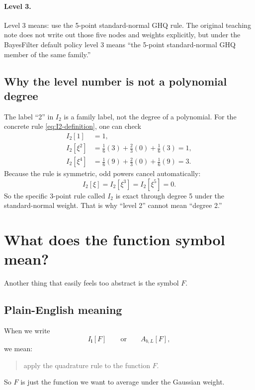 \documentclass[11pt]{article}
\begin{document}
\paragraph{Level 3.}
Level 3 means: use the 5-point standard-normal GHQ rule.  The original teaching
note does not write out those five nodes and weights explicitly, but under the
BayesFilter default policy level 3 means ``the 5-point standard-normal GHQ
member of the same family.''

\subsection{Why the level number is not a polynomial degree}

The label ``2'' in \(I_2\) is a family label, not the degree of a polynomial.
For the concrete rule \eqref{eq:I2-definition}, one can check
\begin{align}
  I_2[1] &= 1,
  \label{eq:I2-const}\\
  I_2[\xi^2] &= \frac16(3)+\frac23(0)+\frac16(3)=1,
  \label{eq:I2-second}\\
  I_2[\xi^4] &= \frac16(9)+\frac23(0)+\frac16(9)=3.
  \label{eq:I2-fourth}
\end{align}
Because the rule is symmetric, odd powers cancel automatically:
\begin{equation}
  I_2[\xi]=I_2[\xi^3]=I_2[\xi^5]=0.
  \label{eq:I2-odd}
\end{equation}
So the specific 3-point rule called \(I_2\) is exact through degree 5 under the
standard-normal weight.  That is why ``level 2'' cannot mean ``degree 2.''

\section{What does the function symbol mean?}
\label{sec:what-is-F}

Another thing that easily feels too abstract is the symbol \(F\).

\subsection{Plain-English meaning}

When we write
\begin{equation}
  I_{\mathbf i}[F]
  \qquad\text{or}\qquad
  A_{b,L}[F],
  \label{eq:F-symbol-reading}
\end{equation}
we mean:
\begin{quote}
apply the quadrature rule to the function \(F\).
\end{quote}
So \(F\) is just the function we want to average under the Gaussian weight.
\end{document}
